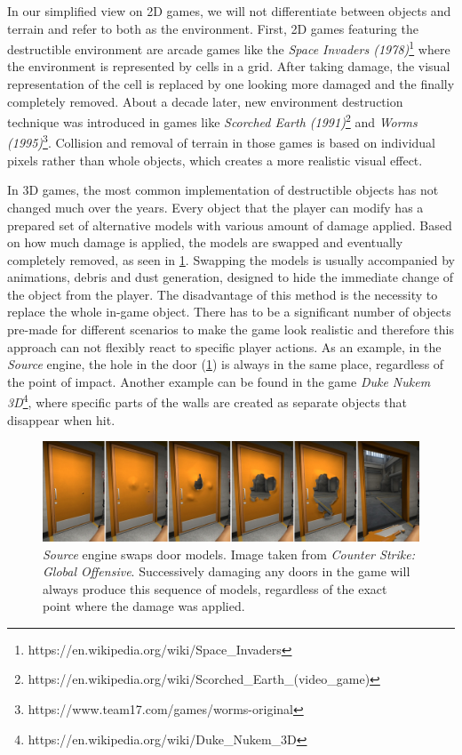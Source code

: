 In our simplified view on 2D games, we will not differentiate between objects and terrain and refer to both as the environment.
First, 2D games featuring the destructible environment are arcade games like the \emph{Space Invaders (1978)}\footnote{https://en.wikipedia.org/wiki/Space\_Invaders} where the environment is represented by cells in a grid. After taking damage, the visual representation of the cell is replaced by one looking more damaged and the finally completely removed. About a decade later, new environment destruction technique was introduced in games like \emph{Scorched Earth (1991)}\footnote{https://en.wikipedia.org/wiki/Scorched\_Earth\_(video\_game)} and \emph{Worms (1995)}\footnote{https://www.team17.com/games/worms-original}. Collision and removal of terrain in those games is based on individual pixels rather than whole objects, which creates a more realistic visual effect.

In 3D games, the most common implementation of destructible objects has not changed much over the years. Every object that the player can modify has a prepared set of alternative models with various amount of damage applied. Based on how much damage is applied, the models are swapped and eventually completely removed, as seen in \cref{fig:doors}. Swapping the models is usually accompanied by animations, debris and dust generation, designed to hide the immediate change of the object from the player. The disadvantage of this method is the necessity to replace the whole in-game object. There has to be a significant number of objects pre-made for different scenarios to make the game look realistic and therefore this approach can not flexibly react to specific player actions. As an example, in the \emph{Source} engine, the hole in the door (\cref{fig:doors}) is always in the same place, regardless of the point of impact. Another example can be found in the game \emph{Duke Nukem 3D}\footnote{https://en.wikipedia.org/wiki/Duke\_Nukem\_3D}, where specific parts of the walls are created as separate objects that disappear when hit.

\begin{figure} 
\centering
\includegraphics[width=\textwidth]{img/doors}
\caption{\emph{Source} engine swaps door models. Image taken from \emph{Counter Strike: Global Offensive}. Successively damaging any doors in the game will always produce this sequence of models, regardless of the exact point where the damage was applied.}
\label{fig:doors}
\end{figure}

